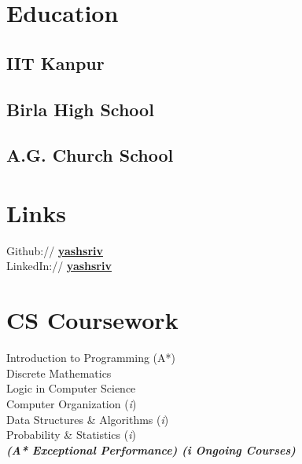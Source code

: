 \documentclass[]{deedy-resume-openfont}
\begin{document}
\begin{minipage}[t]{0.33\textwidth} 


\section{Education} 

\subsection{IIT Kanpur}
\sectionsep{}

\subsection{Birla High School}
\sectionsep{}

\subsection{A.G. Church School}


\section{Links} 
Github:// \href{https://github.com/yashsriv}{\bf yashsriv} \\
LinkedIn://  \href{https://www.linkedin.com/in/yashsriv}{\bf yashsriv} \\


\section{CS Coursework}
Introduction to Programming (A*) \\
Discrete Mathematics \\
Logic in Computer Science \\
Computer Organization (\textit{i}) \\
Data Structures \& Algorithms (\textit{i}) \\
Probability \& Statistics (\textit{i}) \\
{\footnotesize \textit{\textbf{(A* Exceptional Performance) \enspace{} (\textit{i} Ongoing Courses)}}}


\end{minipage}
\end{document}
